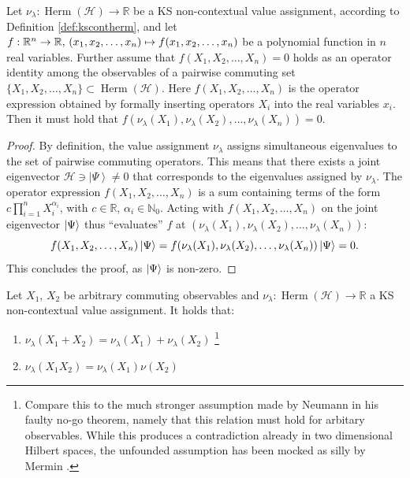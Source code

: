 \begin{lemma}\label{lem:funcconsist}\hfill\break Let $\nu_{\lambda}:\operatorname{Herm}(\mathcal{H})\rightarrow\mathbb{\mathbb{R}}$ be a KS non-contextual value assignment, according to Definition \ref{def:kscontherm}, and let $f:\mathbb{R}^{n}\rightarrow\mathbb{R},\thinspace(x_{1},x_{2},\dots,x_{n})\mapsto f(x_{1},x_{2},\dots,x_{n})$ be a polynomial function in $n$ real variables. Further assume that $f(X_{1},X_{2},\dots,X_{n})=0$ holds as an operator identity among the observables of a pairwise commuting set $\{X_{1},X_{2},\dots,X_{n}\}\subset\operatorname{Herm}(\mathcal{H})$. Here $f(X_{1},X_{2},\dots,X_{n})$ is the operator expression obtained by formally inserting operators $X_{i}$ into the real variables $x_{i}$. Then it must hold that $f(\nu_{\lambda}(X_{1}),\nu_{\lambda}(X_{2}),\dots,\nu_{\lambda}(X_{n}))=0$. 
\end{lemma}

\begin{proof}
By definition, the value assignment $\nu_{\lambda}$ assigns simultaneous eigenvalues to the set of pairwise commuting operators. This means that there exists a joint eigenvector $\mathcal{H}\ni\left|\Psi\right\rangle \neq0$ that corresponds to the eigenvalues assigned by $\nu_{\lambda}$. The operator expression $f(X_{1},X_{2},\dots,X_{n})$ is a sum containing terms of the form $c\prod_{i=1}^{n}X_{i}^{\alpha_{i}}$, with $c\in\mathbb{R}$, $\alpha_{i}\in\mathbb{N}_{0}$. Acting with $f(X_{1},X_{2},\dots,X_{n})$ on the joint eigenvector $\ket{\Psi}$ thus “evaluates” $f$ at $(\nu_{\lambda}(X_{1}),\nu_{\lambda}(X_{2}),\dots,\nu_{\lambda}(X_{n})):$\begin{equation*}
f(X_{1},X_{2},\dots,X_{n})\ket{\Psi} =f(\nu_{\lambda}(X_{1}),\nu_{\lambda}(X_{2}),\dots,\nu_{\lambda}(X_{n}))\ket{\Psi} =0.\end{equation*} This concludes the proof, as $\ket{\Psi}$  is non-zero.
\end{proof}

\begin{corollary}
\label{cor:funcconsist}
Let $X_1$, $X_2$ be arbitrary commuting observables and $\nu_{\lambda}:\operatorname{Herm}(\mathcal{H})\rightarrow\mathbb{R}$ a KS non-contextual value assignment. It holds that:
\begin{enumerate}
\item{$\nu_{\lambda}(X_1+X_2)=\nu_{\lambda}(X_1)+\nu_{\lambda}(X_2)$ \footnote{Compare this to the much stronger assumption made by Neumann in his faulty no-go theorem, namely that this relation must hold for arbitary observables. While this produces a contradiction already in two dimensional Hilbert spaces, the unfounded assumption has been mocked as silly by Mermin \cite{Mermin1993}.}}
\item{$\nu_{\lambda}(X_1X_2)=\nu_{\lambda}(X_1)\nu(X_2)$}
\end{enumerate}
\end{corollary}

